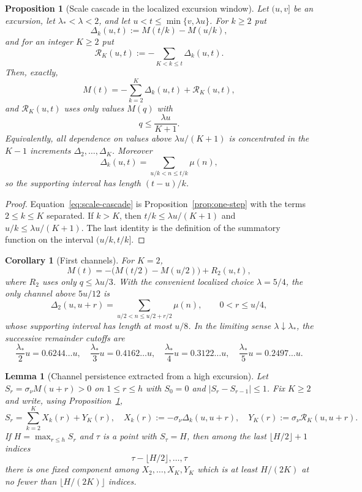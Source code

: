 \documentclass[11pt]{amsart}
\numberwithin{equation}{section}
\theoremstyle{plain}
\newtheorem{proposition}[theorem]{Proposition}
\newtheorem{lemma}[theorem]{Lemma}
\newtheorem{corollary}[theorem]{Corollary}
\theoremstyle{definition}
\theoremstyle{remark}
\begin{document}
\begin{proposition}[Scale cascade in the localized excursion window]
\label{prop:scale-cascade}
Let $(u,v]$ be an excursion, let $\lambda_*<\lambda<2$, and let
$u<t\le\min\{v,\lambda u\}$.  For $k\ge2$ put
\[
\Delta_k(u,t):=M(t/k)-M(u/k),
\]
and for an integer $K\ge2$ put
\[
\mathcal R_K(u,t):=-\sum_{K<k\le t}\Delta_k(u,t).
\]
Then, exactly,
\begin{equation}
\label{eq:scale-cascade}
M(t)=-\sum_{k=2}^{K}\Delta_k(u,t)+\mathcal R_K(u,t),
\end{equation}
and $\mathcal R_K(u,t)$ uses only values $M(q)$ with
\[
q\le\frac{\lambda u}{K+1}.
\]
Equivalently, all dependence on values above $\lambda u/(K+1)$ is
concentrated in the $K-1$ increments
$\Delta_2,\ldots,\Delta_K$.  Moreover
\[
\Delta_k(u,t)=\sum_{u/k<n\le t/k}\mu(n),
\]
so the supporting interval has length $(t-u)/k$.
\end{proposition}

\begin{proof}
Equation~\eqref{eq:scale-cascade} is Proposition~\ref{prop:one-step} with
the terms $2\le k\le K$ separated.  If $k>K$, then
$t/k\le\lambda u/(K+1)$ and $u/k\le\lambda u/(K+1)$.  The last identity is
the definition of the summatory function on the interval $(u/k,t/k]$.
\end{proof}

\begin{corollary}[First channels]
\label{cor:first-channels}
For $K=2$,
\[
M(t)=-\bigl(M(t/2)-M(u/2)\bigr)+R_2(u,t),
\]
where $R_2$ uses only $q\le\lambda u/3$.  With the convenient localized
choice $\lambda=5/4$, the only channel above $5u/12$ is
\[
\Delta_2(u,u+r)=\sum_{u/2<n\le u/2+r/2}\mu(n),
\qquad 0<r\le u/4,
\]
whose supporting interval has length at most $u/8$.  In the limiting
sense $\lambda\downarrow\lambda_*$, the successive remainder cutoffs are
\[
\frac{\lambda_*}{2}u=0.6244\ldots u,\quad
\frac{\lambda_*}{3}u=0.4162\ldots u,\quad
\frac{\lambda_*}{4}u=0.3122\ldots u,\quad
\frac{\lambda_*}{5}u=0.2497\ldots u.
\]
\end{corollary}

\begin{lemma}[Channel persistence extracted from a high excursion]
\label{lem:channel-persistence}
Let $S_r=\sigma_\nu M(u+r)>0$ on $1\le r\le h$ with $S_0=0$ and
$|S_r-S_{r-1}|\le1$.  Fix $K\ge2$ and write, using
Proposition~\ref{prop:scale-cascade},
\[
S_r=\sum_{k=2}^{K}X_k(r)+Y_K(r),
\quad
X_k(r):=-\sigma_\nu\Delta_k(u,u+r),
\quad
Y_K(r):=\sigma_\nu \mathcal R_K(u,u+r).
\]
If $H=\max_{r\le h}S_r$ and $\tau$ is a point with $S_\tau=H$, then among
the last $\lfloor H/2\rfloor+1$ indices
\[
\tau-\lfloor H/2\rfloor,\ldots,\tau
\]
there is one fixed component among
$X_2,\ldots,X_K,Y_K$ which is at least $H/(2K)$ at no fewer than
$\lfloor H/(2K)\rfloor$ indices.
\end{lemma}
\end{document}
